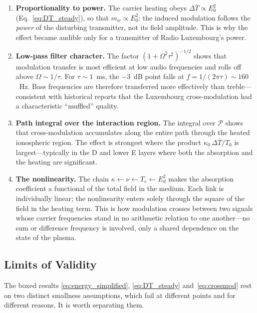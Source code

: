 \documentclass[12pt]{article}
\begin{document}
\begin{enumerate}
  \item \textbf{Proportionality to power.}  The carrier heating obeys
    $\Delta\overline{T} \propto E_0^2$ (Eq.~\ref{eq:DT_steady}), so that
    $m_w \propto E_0^2$: the induced modulation follows the \emph{power} of the
    disturbing transmitter, not its field amplitude.  This is why the effect became
    audible only for a transmitter of Radio Luxembourg's power.

  \item \textbf{Low-pass filter character.}  The factor $(1+\Omega^2\tau^2)^{-1/2}$ shows
    that modulation transfer is most efficient at low audio frequencies and rolls off above
    $\Omega \sim 1/\tau$.  For $\tau \sim 1$~ms, the $-3$~dB point falls at
    $f = 1/(2\pi\tau) \sim 160$~Hz.  Bass frequencies are therefore transferred more
    effectively than treble---consistent with historical reports that the Luxembourg
    cross-modulation had a characteristic ``muffled'' quality.

  \item \textbf{Path integral over the interaction region.}  The integral over $\mathcal{P}$
    shows that cross-modulation accumulates along the entire path through the heated
    ionospheric region.  The effect is strongest where the product
    $\kappa_0\,\Delta\overline{T}/T_0$ is largest---typically in the D and lower E layers
    where both the absorption and the heating are significant.

  \item \textbf{The nonlinearity.}  The chain $\kappa \leftarrow \nu \leftarrow T_e
    \leftarrow E_d^2$ makes the absorption coefficient a functional of the total field in the
    medium.  Each link is individually linear; the nonlinearity enters solely through the
    square of the field in the heating term.  This is how modulation crosses between two
    signals whose carrier frequencies stand in no arithmetic relation to one another---no
    sum or difference frequency is involved, only a shared dependence on the state of the
    plasma.
\end{enumerate}

\subsection{Limits of Validity}
\label{sec:validity}

The boxed results \eqref{eq:energy_simplified}, \eqref{eq:DT_steady}
and~\eqref{eq:crossmod} rest on two distinct smallness assumptions, which fail at different
points and for different reasons.  It is worth separating them.
\end{document}
